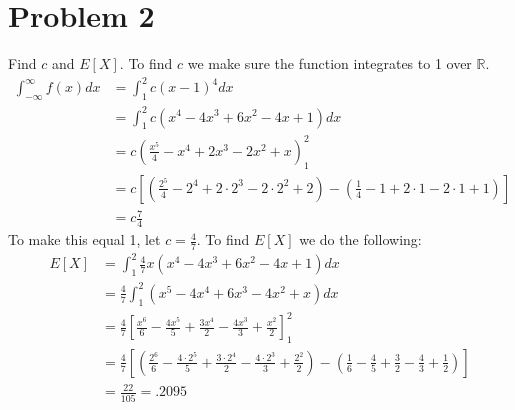 \documentclass{article}
\begin{document}
\section*{Problem 2}
    Find $c$ and $E[X]$.
    To find $c$ we make sure the function integrates to 1 over $\mathbb{R}$.
    \begin{align*}
        \int_{-\infty}^\infty f(x)dx &= \int_1^2 c(x-1)^4 dx\\
        &= \int_1^2 c(x^4 - 4x^3 + 6x^2 - 4x + 1) dx \\
        &= c(\frac{x^5}{4} - x^4 + 2x^3 - 2x^2 + x)_1^2\\
        &= c[(\frac{2^5}{4} - 2^4 + 2 \cdot 2^3 - 2\cdot 2^2 + 2)-(\frac{1}{4} - 1 + 2\cdot 1 - 2\cdot 1 + 1)]\\
        &= c \frac{7}{4}
    \end{align*}
    To make this equal 1, let $c = \frac{4}{7}$. To find $E[X]$ we do the following:
    \begin{align*}
        E[X] &= \int_1^2 \frac{4}{7}x(x^4 - 4x^3 + 6x^2 - 4x + 1) dx \\
        &= \frac{4}{7} \int_1^2 (x^5 - 4x^4 + 6x^3 - 4x^2 + x) dx \\
        &= \frac{4}{7} \left[\frac{x^6}{6} - \frac{4x^5}{5} + \frac{3x^4}{2} - \frac{4x^3}{3} + \frac{x^2}{2}\right]_1^2\\
        &= \frac{4}{7} \left[\left(\frac{2^6}{6} - \frac{4 \cdot 2^5}{5} + \frac{3 \cdot 2^4}{2} - \frac{4 \cdot 2^3}{3} + \frac{2^2}{2}\right)
        - \left( \frac{1}{6} - \frac{4}{5} + \frac{3}{2} - \frac{4}{3} + \frac{1}{2} \right)\right]\\
        &= \frac{22}{105} = .2095
    \end{align*}
\end{document}
